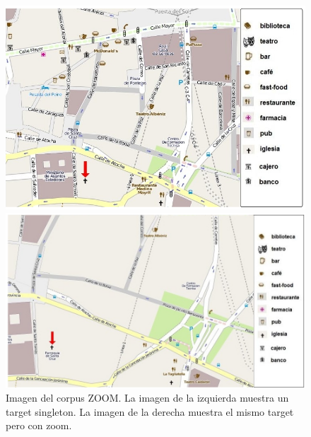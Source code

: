 \begin{figure}
\begin{minipage}[b]{0.48\linewidth}
\centering
\includegraphics[width=\textwidth]{images/corpus/mapa6.png}
\caption{}
\label{mapa15}
\end{minipage}
\hspace*{0cm}
\begin{minipage}[b]{0.55\linewidth}
\centering
\includegraphics[width=\textwidth]{images/corpus/mapa16.png}
\caption{}
\label{mapa16}
\end{minipage}
\caption{Imagen del corpus ZOOM. La imagen de la izquierda muestra un target singleton. La imagen de la derecha muestra el mismo target pero con zoom.}
\end{figure}

